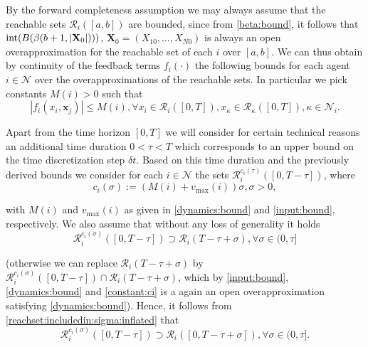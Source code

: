 \documentclass[reqno]{amsart}
\theoremstyle{plain}
\theoremstyle{definition}
\numberwithin{equation}{section}
\begin{document}
\noindent By the forward completeness assumption we may always assume that the reachable sets ${\ensuremath{\mathcal{R}}}_i([a,b])$ are bounded, since from \eqref{beta:bound}, it follows that ${\rm int}(B(\beta(b+1,|{\textbf{{X}}}_0|)))$, ${\textbf{{X}}}_0=(X_{10},\ldots,X_{N0})$ is always an open overapproximation for the reachable set of each $i$ over $[a,b]$.  We can thus obtain by continuity of the feedback terms $f_{i}(\cdot)$ the following bounds for each agent $i\in{\ensuremath{\mathcal{N}}}$ over the overapproximations of the reachable sets. In particular we pick constants $M(i)>0$ such that
\begin{equation} \label{dynamics:bound}
|f_{i}(x_{i},{\textbf{{x}}}_j)|\le M(i), \forall x_{i}\in {\ensuremath{\mathcal{R}}}_i([0,T]),x_{\kappa}\in {\ensuremath{\mathcal{R}}}_{\kappa}([0,T]),\kappa\in{\ensuremath{\mathcal{N}}}_i.
\end{equation}

\noindent Apart from the time horizon $[0,T]$ we will consider for certain technical reasons an additional time duration $0<\tau<T$ which corresponds to an upper bound on the time discretization step $\delta t$. Based on this time duration and the previously derived bounds we consider for each $i\in{\ensuremath{\mathcal{N}}}$ the sets
${\ensuremath{\mathcal{R}}}_i^{c_i(\tau)}([0,T-\tau])$, where 
\begin{equation} \label{constant:ci}
c_i(\sigma):=(M(i)+v_{\max}(i))\sigma,\sigma>0,
\end{equation}

\noindent with $M(i)$ and $v_{\max}(i)$ as given in \eqref{dynamics:bound} and \eqref{input:bound}, respectively. We also assume that without any loss of generality it holds
\begin{equation} \label{reachset:includedin:sigma:inflated}
{\ensuremath{\mathcal{R}}}_i^{c_i(\sigma)}([0,T-\tau])\supset {\ensuremath{\mathcal{R}}}_i(T-\tau+\sigma),\forall \sigma\in(0,\tau]
\end{equation}

\noindent (otherwise we can replace ${\ensuremath{\mathcal{R}}}_i(T-\tau+\sigma)$ by ${\ensuremath{\mathcal{R}}}_i^{c_i(\sigma)}([0,T-\tau])\cap{\ensuremath{\mathcal{R}}}_i(T-\tau+\sigma)$, which by \eqref{input:bound}, \eqref{dynamics:bound} and \eqref{constant:ci} is a again an open overapproximation satisfying \eqref{dynamics:bound}). Hence, it follows from 
\eqref{reachset:includedin:sigma:inflated} that 
\begin{equation} \label{reachset:includedin:sigma:interval:inflated}
{\ensuremath{\mathcal{R}}}_i^{c_i(\sigma)}([0,T-\tau])\supset {\ensuremath{\mathcal{R}}}_i([0,T-\tau+\sigma]),\forall \sigma\in(0,\tau].
\end{equation}
\end{document}
